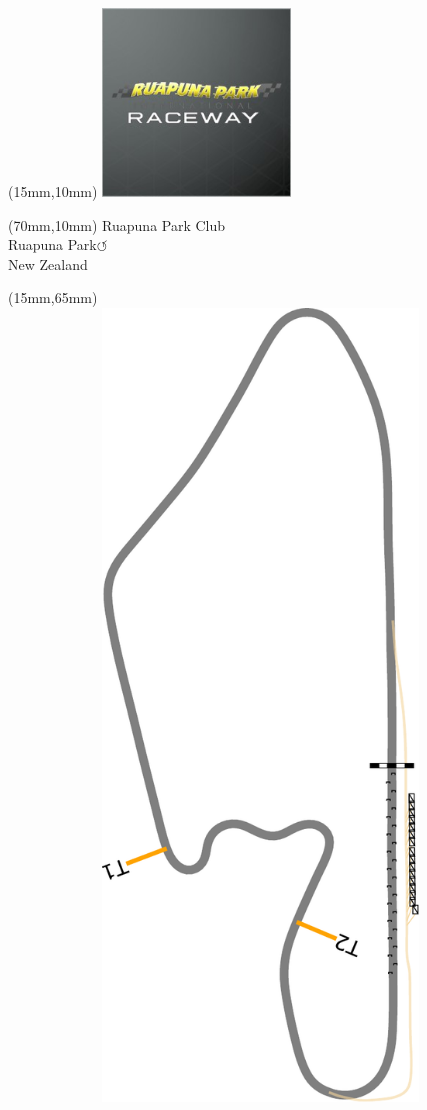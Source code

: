 \null\newpage
\begin{textblock*}{50mm}(15mm,10mm)%
\includegraphics[width=50mm]{LG/RUPU.png}
\end{textblock*}
\begin{textblock*}{130mm}(70mm,10mm)%
{\fontsize{20}{20}\selectfont Ruapuna Park Club\\}
{\fontsize{16}{16}\selectfont Ruapuna Park\hfill \Large$\circlearrowleft$\\}
{\fontsize{12}{12}\selectfont New Zealand\\}
\end{textblock*}
\begin{textblock*}{185mm}(15mm,65mm)%
\centering
\mbox{\includegraphics[width=185mm,height=210mm,keepaspectratio]{PT/RPCL.pdf}}
\end{textblock*}
